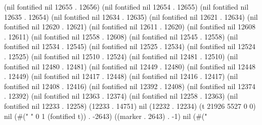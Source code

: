 (nil fontified nil 12655 . 12656) (nil fontified nil 12654 . 12655) (nil fontified nil 12635 . 12654) (nil fontified nil 12634 . 12635) (nil fontified nil 12621 . 12634) (nil fontified nil 12620 . 12621) (nil fontified nil 12611 . 12620) (nil fontified nil 12608 . 12611) (nil fontified nil 12558 . 12608) (nil fontified nil 12545 . 12558) (nil fontified nil 12534 . 12545) (nil fontified nil 12525 . 12534) (nil fontified nil 12524 . 12525) (nil fontified nil 12510 . 12524) (nil fontified nil 12481 . 12510) (nil fontified nil 12480 . 12481) (nil fontified nil 12449 . 12480) (nil fontified nil 12448 . 12449) (nil fontified nil 12417 . 12448) (nil fontified nil 12416 . 12417) (nil fontified nil 12408 . 12416) (nil fontified nil 12392 . 12408) (nil fontified nil 12374 . 12392) (nil fontified nil 12363 . 12374) (nil fontified nil 12258 . 12363) (nil fontified nil 12233 . 12258) (12233 . 14751) nil (12232 . 12234) (t 21926 5527 0 0) nil (#("
" 0 1 (fontified t)) . -2643) ((marker . 2643) . -1) nil (#("

